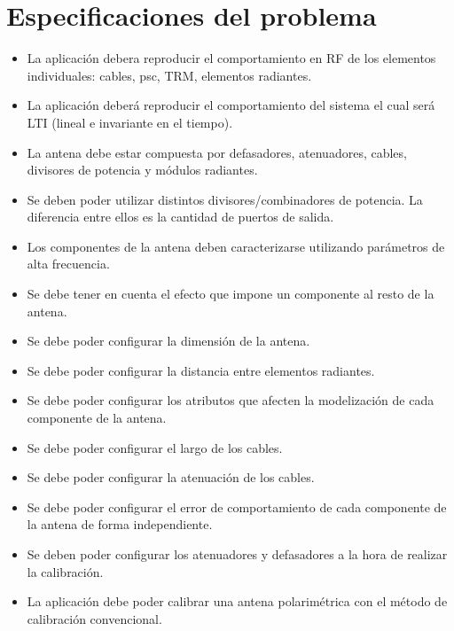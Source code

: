 \section{Especificaciones del problema}

\begin{itemize}
    \item La aplicación debera reproducir el comportamiento en RF de los elementos individuales: cables, psc, TRM, elementos 
			radiantes.

    \item La aplicación deberá reproducir el comportamiento del sistema el cual será LTI (lineal e invariante en el tiempo).
    
    \item La antena debe estar compuesta por defasadores, atenuadores, cables, divisores de potencia y módulos radiantes.
    
    \item Se deben poder utilizar distintos divisores/combinadores de potencia. La diferencia entre ellos es la cantidad de 
			puertos de salida.
    
    \item Los componentes de la antena deben caracterizarse utilizando parámetros de alta frecuencia.
    
    \item Se debe tener en cuenta el efecto que impone un componente al resto de la antena.

    \item Se debe poder configurar la dimensión de la antena.
    \item Se debe poder configurar la distancia entre elementos radiantes.
    \item Se debe poder configurar los atributos que afecten la modelización de cada componente de la antena. 
    
    \item Se debe poder configurar el largo de los cables.
    \item Se debe poder configurar la atenuación de los cables.
    
    \item Se debe poder configurar el error de comportamiento de cada componente de la antena de forma independiente.

    \item Se deben poder configurar los atenuadores y defasadores a la hora de realizar la calibración. 

    \item La aplicación debe poder calibrar una antena polarimétrica con el método de calibración convencional.
    

\end{itemize}
